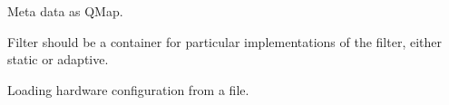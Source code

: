 
\begin{DoxyRefList}
\item[\label{todo__todo000001}%
\hypertarget{todo__todo000001}{}%
\hyperlink{classClass}{Class} \hyperlink{classClass}{Class} ]Meta data as Q\-Map. 

Filter should be a container for particular implementations of the filter, either static or adaptive.  
\item[\label{todo__todo000002}%
\hypertarget{todo__todo000002}{}%
Member \hyperlink{sbs2common_8h_a58086ba40308eeeaa3ed3c3cc323bcc1}{D\-E\-P\-L\-O\-Y\-M\-E\-N\-T} ]Loading hardware configuration from a file. 
\end{DoxyRefList}